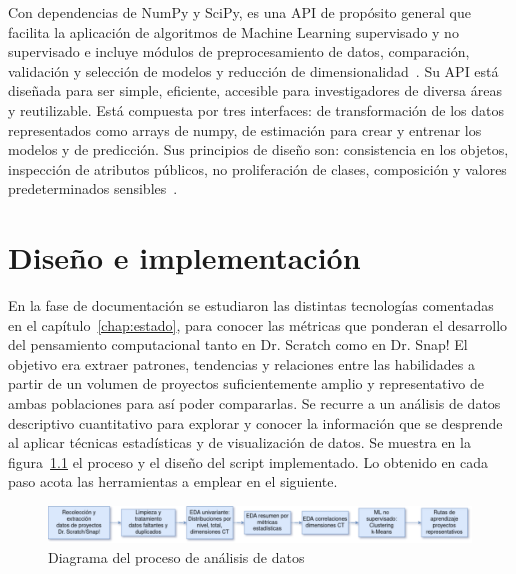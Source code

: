 \documentclass[a4paper, 12pt]{book}
\begin{document}
Con dependencias de NumPy y SciPy, es una API de propósito general que facilita la aplicación de algoritmos de Machine Learning supervisado y no supervisado e incluye módulos de preprocesamiento de datos, comparación, validación y selección de modelos y reducción de dimensionalidad~\cite{pedregosa2011scikit}. Su API está diseñada para ser simple, eficiente, accesible para investigadores de diversa áreas y reutilizable. Está compuesta por tres interfaces: de transformación de los datos representados como arrays de numpy, de estimación para crear y entrenar los modelos y de predicción. Sus principios de diseño son: consistencia en los objetos, inspección de atributos públicos, no proliferación de clases, composición y valores predeterminados sensibles~\cite{sklearn_api}.




\cleardoublepage
\chapter{Diseño e implementación}
\label{chap:diseño_implementación}

En la fase de documentación se estudiaron las distintas tecnologías comentadas en el capítulo~\ref{chap:estado}, para conocer las métricas que ponderan el desarrollo del pensamiento computacional tanto en Dr. Scratch como en Dr. Snap! El objetivo era extraer patrones, tendencias y relaciones entre las habilidades a partir de un volumen de proyectos suficientemente amplio y representativo de ambas poblaciones para así poder compararlas. Se recurre a un análisis de datos descriptivo cuantitativo para explorar y conocer la información que se desprende al aplicar técnicas estadísticas y de visualización de datos. Se muestra en la figura~\ref{fig:diseño} el proceso y el diseño del script implementado. Lo obtenido en cada paso acota las herramientas a emplear en el siguiente.

\begin{figure}[H]
    \centering
    \includegraphics[width=1.0\textwidth]{img/diseno_script_2.png}
    \caption{Diagrama del proceso de análisis de datos}\label{fig:diseño}
\end{figure}
\end{document}
